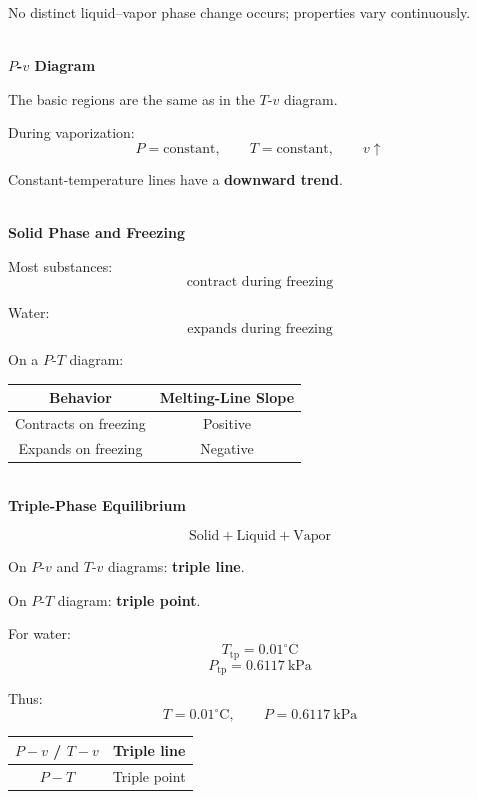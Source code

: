 \documentclass[12pt]{article}
\begin{document}
No distinct liquid--vapor phase change occurs; properties vary continuously.

\textbf{\\ $P$-$v$ Diagram}

The basic regions are the same as in the $T$-$v$ diagram.

During vaporization:
\[
\boxed{
P=\text{constant},\qquad T=\text{constant},\qquad v\uparrow
}
\]

Constant-temperature lines have a \textbf{downward trend}.

\textbf{\\ Solid Phase and Freezing}

Most substances:
\[
\boxed{\text{contract during freezing}}
\]

Water:
\[
\boxed{\text{expands during freezing}}
\]

On a $P$-$T$ diagram:

\begin{center}
\begin{tabular}{|c|c|}
\hline
\textbf{Behavior} & \textbf{Melting-Line Slope} \\
\hline
Contracts on freezing & Positive \\
\hline
Expands on freezing & Negative \\
\hline
\end{tabular}
\end{center}

\textbf{\\ Triple-Phase Equilibrium}

\[
\boxed{\text{Solid}+\text{Liquid}+\text{Vapor}}
\]

On $P$-$v$ and $T$-$v$ diagrams: \textbf{triple line}.

On $P$-$T$ diagram: \textbf{triple point}.

For water:
\[
\boxed{T_{\mathrm{tp}}=0.01^\circ\mathrm{C}}
\]
\[
\boxed{P_{\mathrm{tp}}=0.6117~\mathrm{kPa}}
\]

Thus:
\[
\boxed{
T=0.01^\circ\mathrm{C},
\qquad
P=0.6117~\mathrm{kPa}
}
\]

\begin{center}
\begin{tabular}{|c|c|}
\hline
$P-v$ / $T-v$ & Triple line \\
\hline
$P-T$ & Triple point \\
\hline
\end{tabular}
\end{center}
\end{document}
